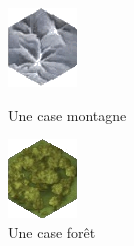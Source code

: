 \begin{figure}[ht]
\begin{minipage}[b]{0.45\linewidth}
\centering
\includegraphics[scale=1.35]{img/montagne.png}
\caption{Une case montagne}
\label{fig:figure1}
\end{minipage}
\hspace{0.5cm}
\begin{minipage}[b]{0.45\linewidth}
\centering
\includegraphics[scale=1]{img/foret.png}
\caption{Une case forêt}
\label{fig:figure2}
\end{minipage}
\end{figure}